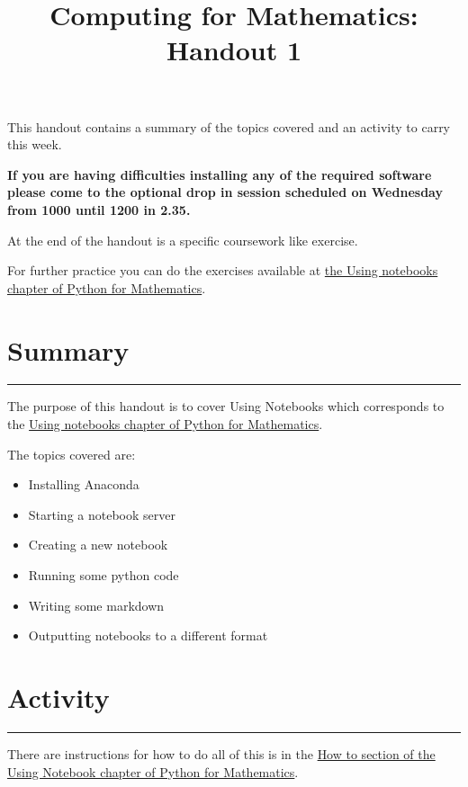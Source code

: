 \documentclass{article}
\title{Computing for Mathematics: Handout 1}
\date{}
\begin{document}
\maketitle


This handout contains a summary of the topics covered and an activity to
carry this week.

\textbf{If you are having difficulties installing any of the required software
please come to the optional drop in session scheduled on Wednesday from 1000
until 1200 in 2.35.}

At the end of the handout is a specific coursework like exercise.

For further practice you can do the exercises available at 
\href{https://vknight.org/pfm/tools-for-mathematics/01-using-notebooks/exercises/main.html}{the Using
notebooks chapter of Python for Mathematics}.

\section{Summary}\label{summary}
\hrule


The purpose of this handout is to cover Using Notebooks which
corresponds to the
\href{https://vknight.org/pfm/tools-for-mathematics/01-using-notebooks/introduction/main.html}{Using
notebooks chapter of Python for Mathematics}.

The topics covered are:

\begin{itemize}
\item
  Installing Anaconda
\item
  Starting a notebook server
\item
  Creating a new notebook
\item
  Running some python code
\item
  Writing some markdown
\item
  Outputting notebooks to a different format
\end{itemize}


\section{Activity}\label{activity}
\hrule

There are instructions for how to do all of this is in the
\href{https://vknight.org/pfm/tools-for-mathematics/01-using-notebooks/how/main.html}{How
to section of the Using Notebook chapter of Python for Mathematics}.
\end{document}
